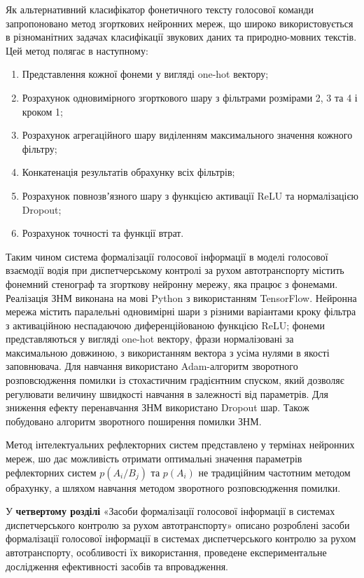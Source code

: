 Як альтернативний класифікатор фонетичного тексту голосової команди запропоновано метод згорткових нейронних мереж, що широко використовується в різноманітних задачах класифікації звукових даних та природно-мовних текстів. Цей метод полягає в наступному:

\begin{enumerate}
	\item Представлення кожної фонеми у вигляді one-hot вектору;
	\item Розрахунок одновимірного згорткового шару з фільтрами розмірами 2, 3 та 4 і кроком 1;
	\item Розрахунок агрегаційного шару виділенням максимального значення кожного фільтру;
	\item Конкатенація результатів обрахунку всіх фільтрів;
	\item Розрахунок повнозвʼязного шару з функцією активації ReLU та нормалізацією Dropout;
	\item Розрахунок точності та функції втрат.
\end{enumerate}

Таким чином система формалізації голосової інформації в моделі голосової взаємодії водія при диспетчерському контролі за рухом автотранспорту містить фонемний стенограф та згорткову нейронну мережу, яка працює з фонемами. Реалізація ЗНМ виконана на мові Python з використанням TensorFlow. Нейронна мережа містить паралельні одновимірні шари з різними варіантами кроку фільтра з активаційною неспадаючою диференційованою функцією ReLU; фонеми представляються у вигляді one-hot вектору, фрази нормалізовані за максимальною довжиною, з використанням вектора з усіма нулями в якості заповнювача. Для навчання використано Adam-алгоритм зворотного розповсюдження помилки із стохастичним градієнтним спуском, який дозволяє регулювати величину швидкості навчання в залежності від параметрів. Для зниження ефекту перенавчання ЗНМ використано Dropout шар. Також побудовано алгоритм зворотного поширення помилки ЗНМ. 

Метод інтелектуальних рефлекторних систем представлено у термінах нейронних мереж, шо дає можливість отримати оптимальні значення параметрів рефлекторних систем $p(A_i/B_j)$ та $p(A_i)$ не традиційним частотним методом обрахунку, а шляхом навчання методом зворотного розповсюдження помилки.

У \textbf{четвертому розділі} «Засоби формалізації голосової інформації в системах диспетчерського контролю за рухом автотранспорту» описано розроблені засоби формалізації голосової інформації в системах диспетчерського контролю за рухом автотранспорту, особливості їх використання, проведене експериментальне дослідження ефективності засобів та впровадження.

